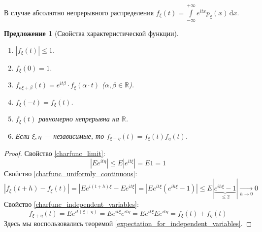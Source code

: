 \documentclass[11pt,openany,a4paper]{scrartcl}
\theoremstyle{plain}
\newtheorem{proposition}[theorem]{Предложение}
\theoremstyle{definition}
\newcommand\mb{\mathbb}
\newcommand\real{\mb R}
\newcommand{\underto}[1]{\xrightarrow[#1]{}}
\newcommand{\dif}{\, \mathrm d}
\newcommand{\ol}{\overline}
\begin{document}
В случае абсолютно непрерывного распределения $f_\xi(t) =
\int\limits_{-\infty}^{+\infty} e^{itx}p_\xi(x)\dif x$.

\begin{proposition}[Свойства характеристической функции]
\mbox{}
    \begin{enumerate}
        \item\label{charfunc_limit} $|f_\xi(t)| \leqslant 1$.
        \item $f_\xi(0) = 1$.
        \item $f_{a\xi + \beta}(t) = e^{it\beta}\cdot f_\xi(\alpha\cdot t)$
        ($\alpha, \beta \in \real$).
        \item $f_\xi(-t) = \ol{f_\xi(t)}$.
        \item\label{charfunc_uniformly_continuous}
        $f_\xi(t)$ равномерно непрерывна на $\real$.
        \item\label{charfunc_independent_variables}
        Если $\xi, \eta$ — независимые, то
        $f_{\xi + \eta}(t) = f_\xi(t)f_\eta(t)$.
    \end{enumerate}
\end{proposition}
\begin{proof}
    Свойство \ref{charfunc_limit}:
    $$
    |Ee^{it\eta}| \leqslant E|e^{it\xi}| = E1 = 1
    $$
    Свойство \ref{charfunc_uniformly_continuous}:
    $$
    |f_\xi(t + h) - f_\xi(t)| = |Ee^{i(t+h)\xi} - Ee^{it\xi}| =
    |Ee^{it\xi}(e^{ih\xi} - 1)| \leqslant
    E|\underbrace{e^{ih\xi} - 1}_{\leqslant 2}| \underto{h \to 0} 0
    $$
    Свойство \ref{charfunc_independent_variables}:
    $$
    f_{\xi + \eta}(t) = Ee^{it(\xi + \eta)} = Ee^{it\xi}e^{it\eta} =
    Ee^{it\xi}Ee^{it\eta} = f_\xi(t) + f_\eta(t)
    $$
    Здесь мы воспользовались теоремой \ref{expectation_for_independent_variables}.
\end{proof}
\end{document}

